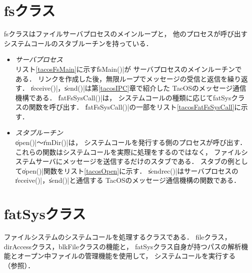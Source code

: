 \section{fsクラス}
fsクラスはファイルサーバプロセスのメインループと，
他のプロセスが呼び出すシステムコールのスタブルーチンを持っている．

\begin{itemize}
\item \emph{サーバプロセス}\\
  リスト\ref{tacosFsMain}に示す\|fsMain()|が
  サーバプロセスのメインルーチンである．
  リンクを作成した後，無限ループでメッセージの受信と返信を繰り返す．
  \|receive()|，\|send()|は第\ref{tacosIPC}章で紹介した
  TacOSのメッセージ通信機構である．
  \|fatFsSysCall()|は，
  システムコールの種類に応じてfatSysクラスの関数を呼び出す．
  \|fatFsSysCall()|の一部をリスト\ref{tacosFatFsSysCall}に示す．
  
  
\item \emph{スタブルーチン}\\
  \|open()|〜\|rmDir()|は，
  システムコールを発行する側のプロセスが呼び出す．
  これらの関数はシステムコールを実際に処理をするのではなく，
  ファイルシステムサーバにメッセージを送信するだけのスタブである．
  スタブの例として\|open()|関数をリスト\ref{tacosOpen}に示す．
  \|sendrec()|はサーバプロセスの\|receive()|，\|send()|と通信する
  TacOSのメッセージ通信機構の関数である．
  
\end{itemize}

\section{fatSysクラス}
ファイルシステムのシステムコールを処理するクラスである．
fileクラス，dirAccessクラス，blkFileクラスの機能と，
fatSysクラス自身が持つパスの解析機能とオープン中ファイルの管理機能を使用して，
システムコールを実行する（参照）．

